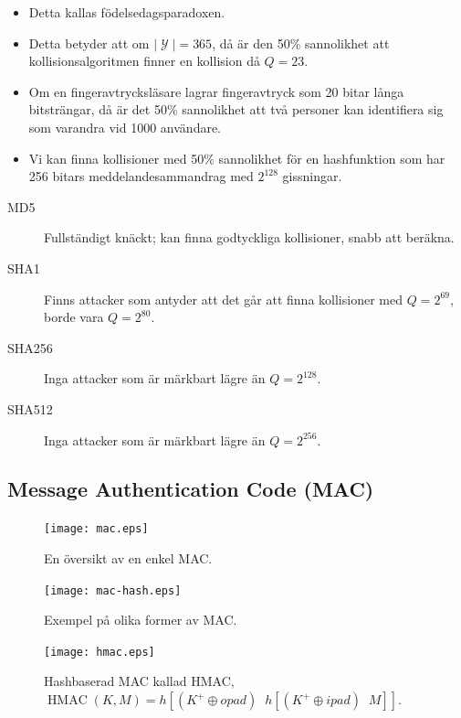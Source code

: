 \documentclass{beamer}
\theoremstyle{definition}
\DeclareMathOperator{\Y}{\mathcal{Y}}
\DeclareMathOperator{\xor}{\oplus}
\DeclareMathOperator{\hmac}{HMAC}
\DeclareMathOperator{\concat}{||}
\begin{document}
\begin{frame}{\insertsubsectionhead}
  \begin{itemize}
    \item Detta kallas födelsedagsparadoxen.
    \item Detta betyder att om \(|\Y| = 365\), då är den \unit{50}{\%} 
      sannolikhet att kollisionsalgoritmen finner en kollision då \(Q = 23\).
    \item Om en fingeravtrycksläsare lagrar fingeravtryck som 20 bitar långa 
      bitsträngar, då är det \unit{50}{\%} sannolikhet att två personer kan 
      identifiera sig som varandra vid 1000 användare.
    \item Vi kan finna kollisioner med \unit{50}{\%} sannolikhet för en 
      hashfunktion som har 256 bitars meddelandesammandrag med \(2^{128}\) 
      gissningar.
  \end{itemize}
\end{frame}
\begin{frame}{\insertsubsectionhead}
  \begin{description}
    \item[MD5] Fullständigt knäckt; kan finna godtyckliga kollisioner, snabb 
      att beräkna.
    \item[SHA1] Finns attacker som antyder att det går att finna kollisioner 
      med \(Q = 2^{69}\), borde vara \(Q = 2^{80}\).
    \item[SHA256] Inga attacker som är märkbart lägre än \(Q = 2^{128}\).
    \item[SHA512] Inga attacker som är märkbart lägre än \(Q = 2^{256}\).
  \end{description}
\end{frame}

\subsection{Message Authentication Code (MAC)}
\begin{frame}{\insertsubsectionhead}
  \begin{figure}
    \texttt{[image: mac.eps]}
    \caption{En översikt av en enkel MAC.}
  \end{figure}
\end{frame}
\begin{frame}{\insertsubsectionhead}
  \begin{figure}
    \texttt{[image: mac-hash.eps]}
    \caption{Exempel på olika former av MAC.}
  \end{figure}
\end{frame}
\begin{frame}{\insertsubsectionhead}
  \begin{figure}
    \texttt{[image: hmac.eps]}
    \caption{Hashbaserad MAC kallad HMAC, \(\hmac(K, M) = h[ (K^+\xor opad) 
    \concat h[ (K^+\xor ipad) \concat M]]\).}
  \end{figure}
\end{frame}
\end{document}
